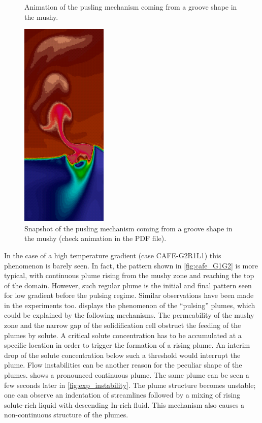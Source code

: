 \begin{figure}[htbp]
\centering
%
%
	{%
		\caption{Animation of the pusling mechanism coming from a groove shape in the mushy.}
	}
	{%
		\includegraphics[height=10cm]{Chapter4/Graphics/freckle_cafe/anim_pulsing/img2.png}
		\caption{Snapshot of the pusling mechanism coming from a groove shape in the mushy (check animation in the PDF file).} 
	}
\label{fig:animate_cafeVG1}
\end{figure}

In the case of a high temperature gradient (case CAFE-G2R1L1) this phenomenon is 
barely seen. In fact, the pattern shown in \cref{fig:cafe_G1G2} is more typical, with continuous plume rising from the mushy 
zone and reaching the top of the domain. However, such regular plume is the initial and final pattern seen for low 
gradient before the pulsing regime. Similar observations have been made in the experiments too.  displays 
the phenomenon of the “pulsing” plumes, which could be explained by the following mechanisms. The permeability of the 
mushy zone and the narrow gap of the solidification cell obstruct the feeding of the plumes by solute. A critical solute 
concentration has to be accumulated at a specific location in order to trigger the formation of a rising plume. An interim 
drop of the solute concentration below such a threshold would interrupt the plume. Flow instabilities can be another reason 
for the peculiar shape of the plumes.  shows a pronounced continuous plume. The same plume can be seen a few seconds 
later in \cref{fig:exp_instability}. The plume structure becomes unstable; one can observe an indentation of streamlines followed by a mixing of 
rising solute-rich liquid with descending In-rich fluid. This mechanism also causes a non-continuous structure of the plumes.

